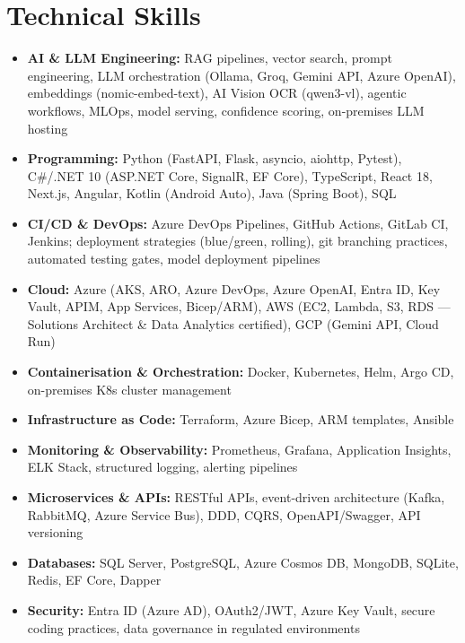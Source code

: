 \documentclass[a4paper,10pt]{article}
\begin{document}
\section*{Technical Skills}
\begin{itemize}[noitemsep]
  \item \textbf{AI \& LLM Engineering:} RAG pipelines, vector search, prompt engineering,
        LLM orchestration (Ollama, Groq, Gemini API, Azure OpenAI), embeddings
        (nomic-embed-text), AI Vision OCR (qwen3-vl), agentic workflows, MLOps,
        model serving, confidence scoring, on-premises LLM hosting
  \item \textbf{Programming:} Python (FastAPI, Flask, asyncio, aiohttp, Pytest),
        C\#/.NET 10 (ASP.NET Core, SignalR, EF Core), TypeScript, React 18, Next.js,
        Angular, Kotlin (Android Auto), Java (Spring Boot), SQL
  \item \textbf{CI/CD \& DevOps:} Azure DevOps Pipelines, GitHub Actions, GitLab CI,
        Jenkins; deployment strategies (blue/green, rolling), git branching practices,
        automated testing gates, model deployment pipelines
  \item \textbf{Cloud:} Azure (AKS, ARO, Azure DevOps, Azure OpenAI, Entra ID, Key Vault,
        APIM, App Services, Bicep/ARM), AWS (EC2, Lambda, S3, RDS --- Solutions Architect
        \& Data Analytics certified), GCP (Gemini API, Cloud Run)
  \item \textbf{Containerisation \& Orchestration:} Docker, Kubernetes, Helm, Argo CD,
        on-premises K8s cluster management
  \item \textbf{Infrastructure as Code:} Terraform, Azure Bicep, ARM templates, Ansible
  \item \textbf{Monitoring \& Observability:} Prometheus, Grafana, Application Insights,
        ELK Stack, structured logging, alerting pipelines
  \item \textbf{Microservices \& APIs:} RESTful APIs, event-driven architecture
        (Kafka, RabbitMQ, Azure Service Bus), DDD, CQRS, OpenAPI/Swagger, API versioning
  \item \textbf{Databases:} SQL Server, PostgreSQL, Azure Cosmos DB, MongoDB, SQLite,
        Redis, EF Core, Dapper
  \item \textbf{Security:} Entra ID (Azure AD), OAuth2/JWT, Azure Key Vault, secure
        coding practices, data governance in regulated environments
\end{itemize}

\end{document}
